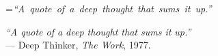 

\cleardoublepage
\thispagestyle{empty}

\vspace*{55pt}

\begin{centering}
  { =\hbox{\emph{``A quote of a deep thought that sums it up.''}}
    \begin{minipage}{\wd0}
    \emph{``A quote of a deep thought that sums it up.''}\\
    \null \hfill  --- Deep Thinker, \emph{The Work}, 1977.
    \end{minipage}
    \par
  }
\end{centering}

\vfill
\cleardoublepage
